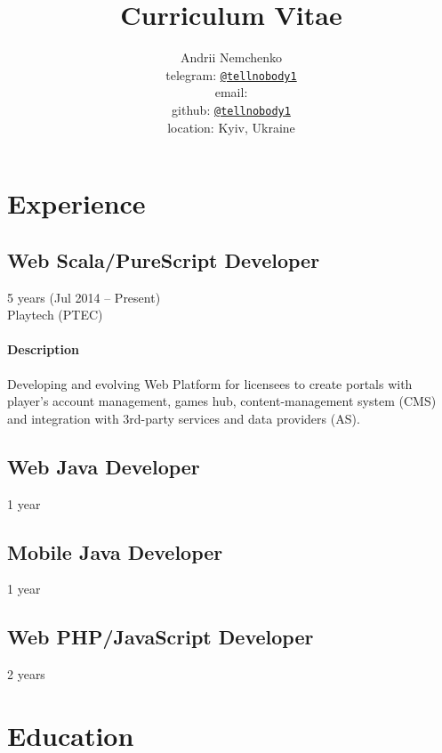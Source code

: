 

\title{Curriculum Vitae}
\author{
  Andrii Nemchenko\\
  telegram: \href{https://t.me/tellnobody1}{\nolinkurl{@tellnobody1}}\\
  email: \\
  github: \href{https://github.com/tellnobody1}{\nolinkurl{@tellnobody1}}\\
  location: Kyiv, Ukraine
}
\maketitle

\section{Experience}
\subsection{Web Scala/PureScript Developer}
5 years (Jul 2014 – Present)\\Playtech (PTEC)
\paragraph{Description}
Developing and evolving Web Platform for licensees to create portals with player's account management, games hub, content-management system (CMS) and integration with 3rd-party services and data providers (AS).

\subsection{Web Java Developer}
1 year

\subsection{Mobile Java Developer}
1 year

\subsection{Web PHP/JavaScript Developer}
2 years

\section{Education}
